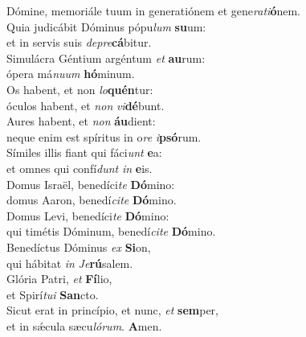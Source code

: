 \oddverse Dómine, memoriále tuum in generatiónem et gene\textit{ra}\textit{ti}\textbf{ó}nem.\\
\evenverse Quia judicábit Dóminus pópu\textit{lum} \textbf{su}um:~\*\\
\evenverse et in servis suis \textit{de}\textit{pre}\textbf{cá}bitur.\\
\oddverse Simulácra Géntium argéntum \textit{et} \textbf{au}rum:~\*\\
\oddverse ópera má\textit{nu}\textit{um} \textbf{hó}minum.\\
\evenverse Os habent, et non \textit{lo}\textbf{quén}tur:~\*\\
\evenverse óculos habent, et \textit{non} \textit{vi}\textbf{dé}bunt.\\
\oddverse Aures habent, et \textit{non} \textbf{áu}dient:~\*\\
\oddverse neque enim est spíritus in o\textit{re} \textit{i}\textbf{psó}rum.\\
\evenverse Símiles illis fiant qui fáci\textit{unt} \textbf{e}a:~\*\\
\evenverse et omnes qui confí\textit{dunt} \textit{in} \textbf{e}is.\\
\oddverse Domus Israël, benedíci\textit{te} \textbf{Dó}mino:~\*\\
\oddverse domus Aaron, benedí\textit{ci}\textit{te} \textbf{Dó}mino.\\
\evenverse Domus Levi, benedíci\textit{te} \textbf{Dó}mino:~\*\\
\evenverse qui timétis Dóminum, benedí\textit{ci}\textit{te} \textbf{Dó}mino.\\
\oddverse Benedíctus Dóminus \textit{ex} \textbf{Si}on,~\*\\
\oddverse qui hábitat \textit{in} \textit{Je}\textbf{rú}salem.\\
\evenverse Glória Patri, \textit{et} \textbf{Fí}lio,~\*\\
\evenverse et Spirí\textit{tu}\textit{i} \textbf{San}cto.\\
\oddverse Sicut erat in princípio, et nunc, \textit{et} \textbf{sem}per,~\*\\
\oddverse et in sǽcula sæcu\textit{ló}\textit{rum}. \textbf{A}men.\\
